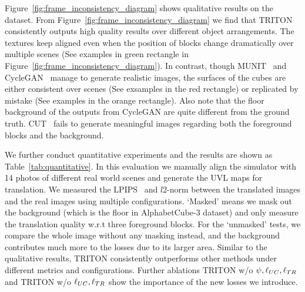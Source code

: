 \documentclass{article}
\begin{document}
Figure~\ref{fig:frame_inconsistency_diagram} shows qualitative results on the dataset.
From Figure~\ref{fig:frame_inconsistency_diagram} we find that TRITON consistently outputs high quality results over different object arrangements.
The textures keep aligned even when the position of blocks change dramatically over multiple scenes (See examples in green rectangle in Figure~\ref{fig:frame_inconsistency_diagram}).
In contrast, though MUNIT~\cite{munit} and CycleGAN~\cite{cyclegan} manage to generate realistic images, the surfaces of the cubes are either consistent over scenes (See exsamples in the red rectangle) or replicated by mistake (See examples in the orange rectangle).
Also note that the floor background of the outputs from CycleGAN are quite different from the ground truth.
CUT~\cite{cut} fails to generate meaningful images regarding both the foreground blocks and the background.

We further conduct quantitative experiments and the results are shown as Table~\ref{tab:quantitative}.
In this evaluation we manually align the simulator with 14 photos of different real world scenes and generate the UVL maps for translation.
We measured the LPIPS~\cite{lpips} and $l2$-norm between the translated images and the real images using multiple configurations.
`Masked' means we mask out the background (which is the floor in AlphabetCube-3 dataset) and only measure the translation quality w.r.t three foreground blocks.
For the `unmasked' tests, we compare the whole image without any masking instead, and the background contributes much more to the losses due to its larger area.
Similar to the qualitative results, TRITON consistently outperforms other methods under different metrics and configurations.
Further ablations TRITON w/o $\psi, \ell_{UC}, \ell_{TR}$ and TRITON w/o $\ell_{UC}, \ell_{TR}$ show the importance of the new losses we introduce.

\end{document}
